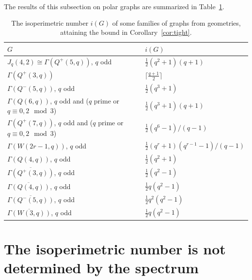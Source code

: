 \documentclass[a4paper,11pt]{article}
\theoremstyle{definition}
\begin{document}
The results of this subsection on polar graphs are summarized in Table~\ref{tab:exactnumbergeom}.

\begin{table}[H]
\renewcommand{\arraystretch}{1.5}
    \centering
    \begin{tabular}{l|l}
        \(G\) & \(i(G)\)%
        \\
        \hline\hline
        \(J_q(4,2)\cong\Gamma(Q^+(5,q))\), \(q\) odd & \(\frac12(q^2+1)(q+1)\)\\%
        \(\Gamma(Q^+(3,q))\) & \(\lceil\frac{q+1}2\rceil\)\\%
        \(\Gamma(Q^-(5,q))\), \(q\) odd & \(\frac12(q^3+1)\)\\%
        \(\Gamma(Q(6,q))\), \(q\) odd and ($q$ prime or $q \equiv 0,2 \mod 3$) & \(\frac12(q^3+1)(q+1)\)\\
        \(\Gamma(Q^+(7,q))\), \(q\) odd and ($q$ prime or $q \equiv 0,2 \mod 3$) & \(\frac12(q^6-1)/(q-1)\)\\
        \(\Gamma(W(2r-1,q))\), \(q\) odd & \(\frac12(q^r+1)(q^{r-1}-1)/(q-1)\)\\
        \(\Gamma(Q(4,q))\), \(q\) odd & \(\frac12(q^2+1)\)\\
        \(\overline{\Gamma(Q^+(3,q))}\), \(q\) odd & \(\frac12(q^2-1)\)\\
        \(\overline{\Gamma(Q(4,q))}\), \(q\) odd & \(\frac12q(q^2-1)\)\\
        \(\overline{\Gamma(Q^-(5,q))}\), \(q\) odd & \(\frac12q^2(q^2-1)\)\\
        \(\overline{\Gamma(W(3,q))}\), \(q\) odd & \(\frac12q(q^2-1)\)
    \end{tabular}
    \caption{The isoperimetric number \(i(G)\) of some families of graphs from geometries, attaining the bound in Corollary~\ref{cor:tight}.}
    \label{tab:exactnumbergeom}
\end{table}

\section{The isoperimetric number is not determined by the spectrum}\label{sec:NDS}
\end{document}
